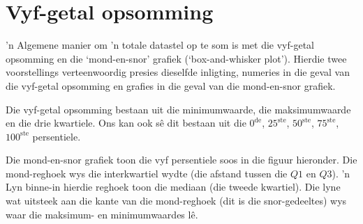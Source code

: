 \section{Vyf-getal opsomming}
’n Algemene manier om ’n totale datastel op te som is met die vyf-getal opsomming en die ‘mond-en-snor’ grafiek (‘box-and-whisker plot’). Hierdie twee voorstellings verteenwoordig presies dieselfde inligting, numeries in die geval van die vyf-getal opsomming en grafies in die geval van die mond-en-snor grafiek.

\par
Die vyf-getal opsomming bestaan uit die minimumwaarde, die maksimumwaarde en die drie kwartiele. Ons kan ook sê dit bestaan uit die $0^{\mathrm{de}}$,
$25^{\mathrm{ste}}$, $50^{\mathrm{ste}}$, $75^{\mathrm{ste}}$, $100^{\mathrm{ste}}$ persentiele.

Die mond-en-snor grafiek toon die vyf persentiele soos in die figuur hieronder. Die mond-reghoek wys die interkwartiel wydte (die afstand tussen die  $Q1$ en $Q3$). ’n Lyn binne-in hierdie reghoek toon die mediaan (die tweede kwartiel). Die lyne wat uitsteek aan die kante van die mond-reghoek (dit is die snor-gedeeltes) wys waar die maksimum- en minimumwaardes lê. 
\par
{}
\clearpage
\begin{figure}[t]
  \begin{center}
  \end{center}
\end{figure}
\vspace{1cm}

